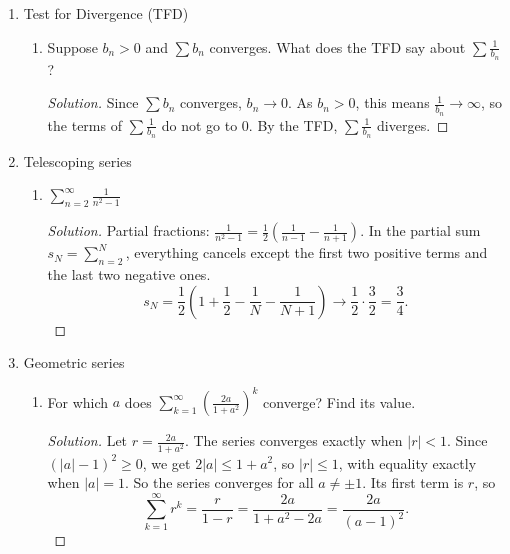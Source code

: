 \documentclass[12pt]{article}
\newenvironment{solution}
  {\renewcommand\qedsymbol{$\blacksquare$}\begin{proof}[Solution]}
  {\end{proof}}
\begin{document}
\begin{enumerate}
\begin{enumerate}
\end{enumerate}

\setcounter{enumi}{15}
\item Test for Divergence (TFD)
\begin{enumerate}




\item[(e)] Suppose $b_n>0$ and $\sum b_n$ converges. What does the TFD say about $\sum\frac{1}{b_n}$?
\begin{solution}
Since $\sum b_n$ converges, $b_n\to0$. As $b_n>0$, this means $\frac1{b_n}\to\infty$, so the terms of $\sum\frac1{b_n}$ do not go to $0$. By the TFD, $\sum\frac1{b_n}$ diverges.
\end{solution}

\end{enumerate}

\setcounter{enumi}{16}
\item Telescoping series
\begin{enumerate}
\item[(a)] $\sum_{n=2}^\infty\frac{1}{n^2-1}$
\begin{solution}
Partial fractions: $\frac{1}{n^2-1}=\frac12\left(\frac{1}{n-1}-\frac{1}{n+1}\right)$. In the partial sum $s_N=\sum_{n=2}^N$, everything cancels except the first two positive terms and the last two negative ones.
\[ s_N=\frac12\left(1+\frac12-\frac1N-\frac1{N+1}\right)\to\frac12\cdot\frac32=\frac34. \]
\end{solution}





\end{enumerate}

\setcounter{enumi}{17}
\item Geometric series
\begin{enumerate}




\item[(e)] For which $a$ does $\sum_{k=1}^\infty\left(\frac{2a}{1+a^2}\right)^k$ converge? Find its value.
\begin{solution}
Let $r=\frac{2a}{1+a^2}$. The series converges exactly when $|r|<1$. Since $(|a|-1)^2\ge0$, we get $2|a|\le1+a^2$, so $|r|\le1$, with equality exactly when $|a|=1$. So the series converges for all $a\neq\pm1$. Its first term is $r$, so
\[ \sum_{k=1}^\infty r^k=\frac{r}{1-r}=\frac{2a}{1+a^2-2a}=\frac{2a}{(a-1)^2}. \]
\end{solution}


\end{enumerate}
\end{enumerate}
\end{document}
